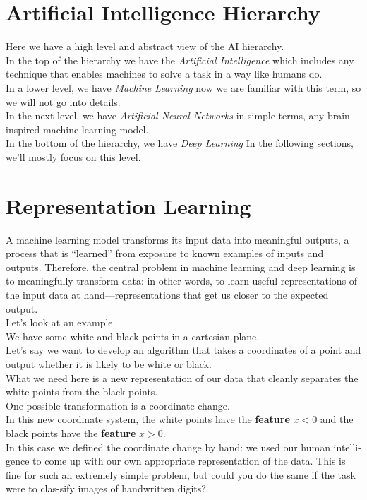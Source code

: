 \documentclass{SBCbookchapter}
\begin{document}
\section*{Artificial Intelligence Hierarchy}
Here we have a high level and abstract view of the AI hierarchy.\\
In the top of the hierarchy we have the \textit{Artificial Intelligence}
which includes any technique that enables machines to solve a task in a
way like humans do.\\
In a lower level, we have \textit{Machine Learning}
now we are familiar with this term, so we will not go into details.\\
In the next level, we have \textit{Artificial Neural Networks}
in simple terms, any brain-inspired machine learning model. \\
In the bottom of the hierarchy, we have \textit{Deep Learning}
In the following sections, we'll mostly focus on this level.

\section*{Representation Learning}
A machine learning model transforms its input data
into meaningful outputs, a process that is “learned” 
from exposure to known examples of inputs and outputs. 
Therefore,  the  central  problem  in  machine  learning
and  deep  learning  is  to meaningfully transform  data:
in  other  words,  to  learn  useful representations
of  the  input  data  at hand—representations that 
get us closer to the expected output. \\
Let's look at an example. \\
We have some white and black points in a cartesian plane. \\
Let's say we want to develop an algorithm that takes a coordinates
of a point and output whether it is likely to be white or black. \\
What we need here is a new representation of our data that cleanly 
separates the white points  from  the  black  points. \\
One  possible transformation is a coordinate change. \\
In this new coordinate system, the white points have the \textbf{feature}
$x < 0$ and the black points have the \textbf{feature} $x > 0$. \\
In this case we defined the coordinate change by hand: 
we used our human intelli-gence to come up with our 
own appropriate representation of the data. This 
is fine for such an extremely simple problem, 
but could you do the same if the task were to 
clas-sify images of handwritten digits?
\end{document}

